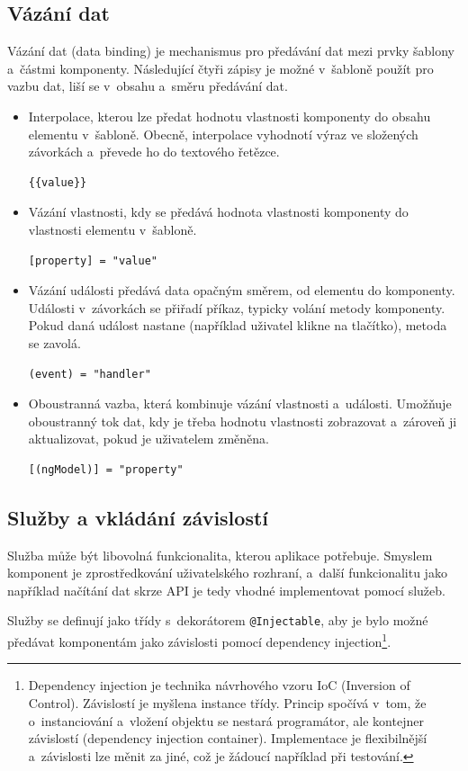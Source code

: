 \documentclass[
  digital, %
  oneside, %
  table,   %
  nolof,     %
  nolot,     %
]{fithesis3}
\begin{document}
\subsection{Vázání dat}
Vázání dat (data binding) je mechanismus pro předávání dat mezi prvky šablony a~částmi komponenty. Následující čtyři zápisy je možné v~šabloně použít pro vazbu dat, liší se v~obsahu a~směru předávání dat. \cite{angulario}
\begin{itemize}
  \item Interpolace, kterou lze předat hodnotu vlastnosti komponenty do obsahu elementu v~šabloně. Obecně, interpolace vyhodnotí výraz ve složených závorkách a~převede ho do textového řetězce.
\begin{lstlisting}[showstringspaces=false]
{{value}}
\end{lstlisting}
  \item Vázání vlastnosti, kdy se předává hodnota vlastnosti komponenty do vlastnosti elementu v~šabloně.
  \begin{lstlisting}[showstringspaces=false]
[property] = "value"
\end{lstlisting}
  \item Vázání události předává data opačným směrem, od elementu do komponenty. Události v~závorkách se přiřadí příkaz, typicky volání metody komponenty. Pokud daná událost nastane (například uživatel klikne na tlačítko), metoda se zavolá.
\begin{lstlisting}[showstringspaces=false]
(event) = "handler"
\end{lstlisting}
  \item Oboustranná vazba, která kombinuje vázání vlastnosti a~události. Umožňuje oboustranný tok dat, kdy je třeba hodnotu vlastnosti zobrazovat a~zároveň ji aktualizovat, pokud je uživatelem změněna.
\begin{lstlisting}[showstringspaces=false]
[(ngModel)] = "property"
\end{lstlisting}
\end{itemize}

\subsection{Služby a vkládání závislostí}
Služba může být libovolná funkcionalita, kterou aplikace potřebuje. Smyslem komponent je zprostředkování uživatelského rozhraní, a~další funkcionalitu jako například načítání dat skrze API je tedy vhodné implementovat pomocí služeb. \cite{angulario}\par
Služby se definují jako třídy s~dekorátorem \verb|@Injectable|, aby je bylo možné předávat komponentám jako závislosti pomocí dependency injection\footnote{Dependency injection je technika návrhového vzoru IoC (Inversion of Control). Závislostí je myšlena instance třídy. Princip spočívá v~tom, že o~instanciování a~vložení objektu se nestará programátor, ale kontejner závislostí (dependency injection container). Implementace je flexibilnější a~závislosti lze měnit za jiné, což je žádoucí například při testování.}.
\end{document}
